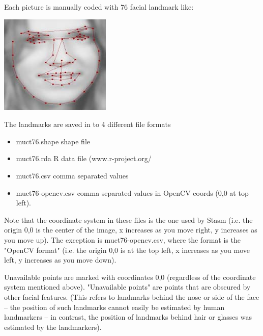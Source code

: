 \documentclass[11pt]{article}
\begin{document}
Each picture is manually coded with 76 facial landmark like:
\begin{center}
\includegraphics[width=.9\linewidth]{./images/landmarks.jpg}
\end{center}


The landmarks are saved in to 4 different file formats

\begin{itemize}
\item muct76.shape       shape file \cite{milborrow2009active}
\item muct76.rda         R data file (www.r-project.org/
\item muct76.csv         comma separated values
\item muct76-opencv.csv  comma separated values in OpenCV coords (0,0 at top left).
\end{itemize}


Note that the coordinate system in these files is the one used by
Stasm (i.e. the origin 0,0 is the center of the image, x increases as
you move right, y increases as you move up).  The exception is
muct76-opencv.csv, where the format is the "OpenCV format" (i.e. the
origin 0,0 is at the top left, x increases as you move left, y
increases as you move down).

Unavailable points are marked with coordinates 0,0 (regardless of the
coordinate system mentioned above).  "Unavailable points" are points
that are obscured by other facial features.  (This refers to landmarks
behind the nose or side of the face -- the position of such landmarks
cannot easily be estimated by human landmarkers -- in contrast, the
position of landmarks behind hair or glasses was estimated by the
landmarkers).  
\end{document}
